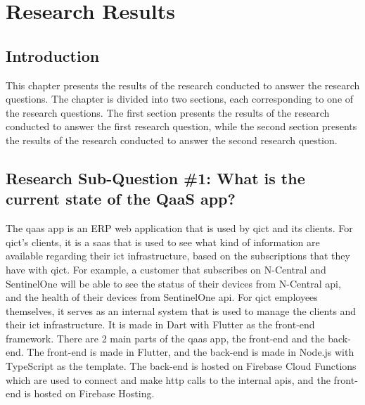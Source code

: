 \chapter{Research Results}
\section{Introduction}
This chapter presents the results of the research conducted to answer the research questions. The chapter is
divided into two sections, each corresponding to one of the research questions. The first section presents
the results of the research conducted to answer the first research question, while the second section
presents the results of the research conducted to answer the second research question.

\section{Research Sub-Question \#1: What is the current state of the QaaS app?}

The \acrshort{qaas} app is an \gls{ERP} web application that is used by \acrshort{qict} and its clients.
For \acrshort{qict}'s clients, it is a \acrshort{saas} that is used to see what kind of information are available
regarding their \acrshort{ict} infrastructure, based on the subscriptions that they have with \acrshort{qict}.
For example, a customer that subscribes on N-Central and SentinelOne will be able to see the status of their
devices from N-Central \acrshort{api}, and the health of their devices from SentinelOne \acrshort{api}.
For \acrshort{qict} employees themselves, it serves as an internal system that is used to manage the clients and their
\acrshort{ict} infrastructure. It is made in Dart with Flutter as the front-end framework. There are 2 main parts of the
\acrshort{qaas} app, the front-end and the back-end. The front-end is made in Flutter, and the back-end is made in Node.js with
TypeScript as the template. The back-end is hosted on Firebase Cloud Functions which are used to connect and make \acrshort{http}
calls to the internal \acrshort{api}s, and the front-end is hosted on Firebase Hosting.

